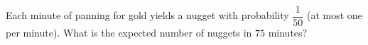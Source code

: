 Each minute of panning for gold yields a nugget with probability $\dfrac1{50}$ (at most one per minute). What is the expected number of nuggets in $75$ minutes?
